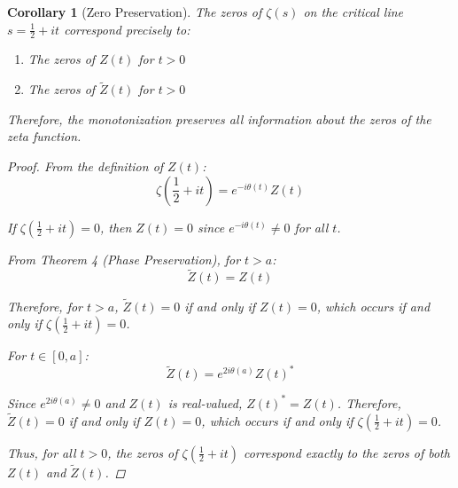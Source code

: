\documentclass{article}
\newtheorem{corollary}[theorem]{Corollary}
\theoremstyle{definition}
\begin{document}
\begin{corollary}[Zero Preservation]
The zeros of $\zeta(s)$ on the critical line $s = \frac{1}{2} + it$ correspond precisely to:
\begin{enumerate}
    \item The zeros of $Z(t)$ for $t > 0$
    \item The zeros of $\tilde{Z}(t)$ for $t > 0$
\end{enumerate}
Therefore, the monotonization preserves all information about the zeros of the zeta function.

\begin{proof}
From the definition of $Z(t)$:
\begin{equation}
\zeta\left(\frac{1}{2} + it\right) = e^{-i\theta(t)}Z(t)
\end{equation}

If $\zeta(\frac{1}{2} + it) = 0$, then $Z(t) = 0$ since $e^{-i\theta(t)} \neq 0$ for all $t$.

From Theorem 4 (Phase Preservation), for $t > a$:
\begin{equation}
\tilde{Z}(t) = Z(t)
\end{equation}

Therefore, for $t > a$, $\tilde{Z}(t) = 0$ if and only if $Z(t) = 0$, which occurs if and only if $\zeta(\frac{1}{2} + it) = 0$.

For $t \in [0,a]$:
\begin{equation}
\tilde{Z}(t) = e^{2i\theta(a)}Z(t)^*
\end{equation}

Since $e^{2i\theta(a)} \neq 0$ and $Z(t)$ is real-valued, $Z(t)^* = Z(t)$. Therefore, $\tilde{Z}(t) = 0$ if and only if $Z(t) = 0$, which occurs if and only if $\zeta(\frac{1}{2} + it) = 0$.

Thus, for all $t > 0$, the zeros of $\zeta(\frac{1}{2} + it)$ correspond exactly to the zeros of both $Z(t)$ and $\tilde{Z}(t)$.
\end{proof}
\end{corollary}
\end{document}
